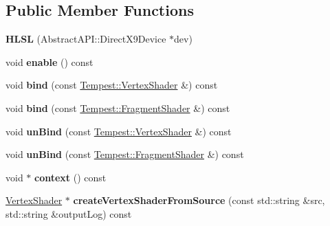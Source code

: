 \subsection*{Public Member Functions}
\begin{DoxyCompactItemize}
\item 
\hypertarget{class_tempest_1_1_h_l_s_l_a8bab5c8f23d7f9a325aa8c6f5be15b0a}{{\bfseries H\+L\+S\+L} (Abstract\+A\+P\+I\+::\+Direct\+X9\+Device $\ast$dev)}\label{class_tempest_1_1_h_l_s_l_a8bab5c8f23d7f9a325aa8c6f5be15b0a}

\item 
\hypertarget{class_tempest_1_1_h_l_s_l_a573baa77cb78144c122ebd9d61a178fd}{void {\bfseries enable} () const }\label{class_tempest_1_1_h_l_s_l_a573baa77cb78144c122ebd9d61a178fd}

\item 
\hypertarget{class_tempest_1_1_h_l_s_l_a09d93e28311a5653b5ccd2b268dd37f3}{void {\bfseries bind} (const \hyperlink{class_tempest_1_1_vertex_shader}{Tempest\+::\+Vertex\+Shader} \&) const }\label{class_tempest_1_1_h_l_s_l_a09d93e28311a5653b5ccd2b268dd37f3}

\item 
\hypertarget{class_tempest_1_1_h_l_s_l_a9dfd518a6457f9a320571c9f44bf258d}{void {\bfseries bind} (const \hyperlink{class_tempest_1_1_fragment_shader}{Tempest\+::\+Fragment\+Shader} \&) const }\label{class_tempest_1_1_h_l_s_l_a9dfd518a6457f9a320571c9f44bf258d}

\item 
\hypertarget{class_tempest_1_1_h_l_s_l_a2a139bbd076b59e199e3c5f20732f7bd}{void {\bfseries un\+Bind} (const \hyperlink{class_tempest_1_1_vertex_shader}{Tempest\+::\+Vertex\+Shader} \&) const }\label{class_tempest_1_1_h_l_s_l_a2a139bbd076b59e199e3c5f20732f7bd}

\item 
\hypertarget{class_tempest_1_1_h_l_s_l_a4434e7de0fe954da7619392cf9d49ec6}{void {\bfseries un\+Bind} (const \hyperlink{class_tempest_1_1_fragment_shader}{Tempest\+::\+Fragment\+Shader} \&) const }\label{class_tempest_1_1_h_l_s_l_a4434e7de0fe954da7619392cf9d49ec6}

\item 
\hypertarget{class_tempest_1_1_h_l_s_l_a7447df6d35d750309b548218e7bf7123}{void $\ast$ {\bfseries context} () const }\label{class_tempest_1_1_h_l_s_l_a7447df6d35d750309b548218e7bf7123}

\item 
\hypertarget{class_tempest_1_1_h_l_s_l_af66fd7d08dfe8c4006db010ef52dff9c}{\hyperlink{class_tempest_1_1_vertex_shader}{Vertex\+Shader} $\ast$ {\bfseries create\+Vertex\+Shader\+From\+Source} (const std\+::string \&src, std\+::string \&output\+Log) const }\label{class_tempest_1_1_h_l_s_l_af66fd7d08dfe8c4006db010ef52dff9c}


\end{DoxyCompactItemize}
